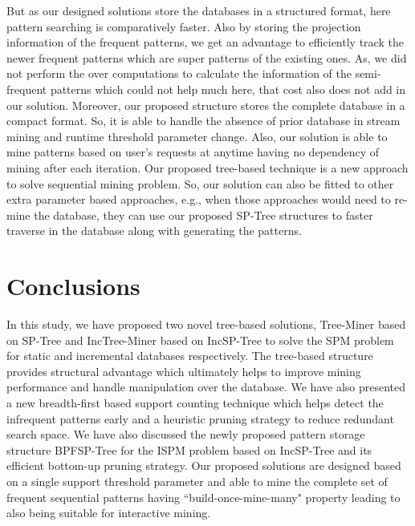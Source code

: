 But as our designed solutions store the databases in a structured format, here pattern searching is comparatively faster. Also by storing the projection information of the frequent patterns, we get an advantage to efficiently track the newer frequent patterns which are super patterns of the existing ones. As, we did not perform the over computations to calculate the information of the semi-frequent patterns which could not help much here, that cost also does not add in our solution. Moreover, our proposed structure stores the complete database in a compact format. So, it is able to handle the absence of prior database in stream mining and runtime threshold parameter change. Also, our solution is able to mine patterns based on user's requests at anytime having no dependency of mining after each iteration. Our proposed tree-based technique is a new approach to solve sequential mining problem. So, our solution can also be fitted to other extra parameter based approaches, e.g., when those approaches would need to re-mine the database, they can use our proposed SP-Tree structures to faster traverse in the database along with generating the patterns.  



\section{Conclusions} \label{conclusion}
In this study, we have proposed two novel tree-based solutions, Tree-Miner based on SP-Tree and IncTree-Miner based on IncSP-Tree to solve the SPM problem for static and incremental databases respectively. The tree-based structure provides structural advantage which ultimately helps to improve mining performance and handle manipulation over the database. We have also presented a new breadth-first based support counting technique which helps detect the infrequent patterns early and a heuristic pruning strategy to reduce redundant search space. We have also discussed the newly proposed pattern storage structure BPFSP-Tree for the ISPM problem based on IncSP-Tree and its efficient bottom-up pruning strategy. Our proposed solutions are designed based on a single support threshold parameter and able to mine the complete set of frequent sequential patterns having ``build-once-mine-many" property leading to also being suitable for interactive mining. 


